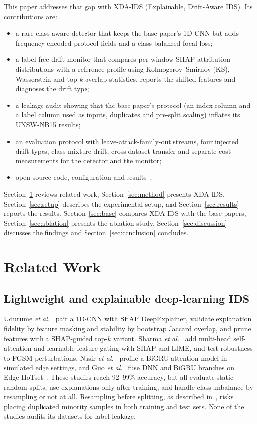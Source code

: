 \documentclass[conference]{IEEEtran}
\begin{document}
This paper addresses that gap with XDA-IDS (Explainable, Drift-Aware IDS). Its contributions are:
\begin{itemize}
\item a rare-class-aware detector that keeps the base paper's 1D-CNN but adds frequency-encoded protocol fields and a class-balanced focal loss;
\item a label-free drift monitor that compares per-window SHAP attribution distributions with a reference profile using Kolmogorov--Smirnov (KS), Wasserstein and top-$k$ overlap statistics, reports the shifted features and diagnoses the drift type;
\item a leakage audit showing that the base paper's protocol (an index column and a label column used as inputs, duplicates and pre-split scaling) inflates its UNSW-NB15 results;
\item an evaluation protocol with leave-attack-family-out streams, four injected drift types, class-mixture drift, cross-dataset transfer and separate cost measurements for the detector and the monitor;
\item open-source code, configuration and results~\cite{repo}.
\end{itemize}

Section~\ref{sec:related} reviews related work, Section~\ref{sec:method} presents XDA-IDS, Section~\ref{sec:setup} describes the experimental setup, and Section~\ref{sec:results} reports the results. Section~\ref{sec:base} compares XDA-IDS with the base papers, Section~\ref{sec:ablation} presents the ablation study, Section~\ref{sec:discussion} discusses the findings and Section~\ref{sec:conclusion} concludes.

\section{Related Work}\label{sec:related}
\subsection{Lightweight and explainable deep-learning IDS}
Udurume \textit{et al.}~\cite{udurume2026} pair a 1D-CNN with SHAP DeepExplainer, validate explanation fidelity by feature masking and stability by bootstrap Jaccard overlap, and prune features with a SHAP-guided top-$k$ variant. Sharma \textit{et al.}~\cite{sharma2025} add multi-head self-attention and learnable feature gating with SHAP and LIME, and test robustness to FGSM perturbations. Nasir \textit{et al.}~\cite{nasir2026} profile a BiGRU-attention model in simulated edge settings, and Guo \textit{et al.}~\cite{guo2026} fuse DNN and BiGRU branches on Edge-IIoTset~\cite{ferrag2022}. These studies reach 92--99\% accuracy, but all evaluate static random splits, use explanations only after training, and handle class imbalance by resampling or not at all. Resampling before splitting, as described in~\cite{sharma2025}, risks placing duplicated minority samples in both training and test sets. None of the studies audits its datasets for label leakage.
\end{document}
